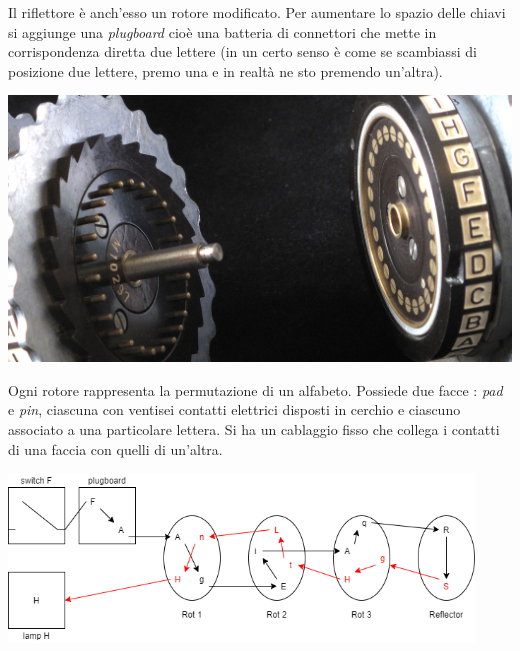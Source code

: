 Il riflettore è anch'esso un rotore modificato. Per aumentare lo spazio delle chiavi si aggiunge una \emph{plugboard} cioè una batteria di connettori che mette in corrispondenza diretta due lettere (in un certo senso è come se scambiassi di posizione due lettere, premo una e in realtà ne sto premendo un'altra). 
\begin{center}
	\includegraphics[scale=.35]{images/17.jpg}
\end{center}
Ogni rotore rappresenta la permutazione di un alfabeto. Possiede due facce : \emph{pad} e \emph{pin}, ciascuna con ventisei contatti elettrici disposti in cerchio e ciascuno associato a una particolare lettera. Si ha un cablaggio fisso che collega i contatti di una faccia con quelli di un'altra.
\begin{center}
  \includegraphics[width = 350pt]{images/Enigma.png}
\end{center}

